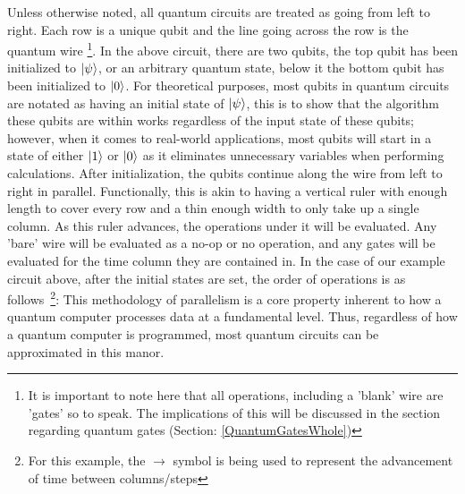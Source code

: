 \documentclass[a4paper]{article}
\begin{document}
	Unless otherwise noted, all quantum circuits are treated as going from left to right. Each row is a unique qubit and the line going across the row is the quantum wire \footnote{It is important to note here that all operations, including a 'blank' wire are 'gates' so to speak.  The implications of this will be discussed in the section regarding quantum gates (Section: \ref{QuantumGatesWhole})}.  In the above circuit, there are two qubits, the top qubit has been initialized to $\left\vert{\psi}\right\rangle$, or an arbitrary quantum state, below it the bottom qubit has been initialized to $\left\vert{0}\right\rangle$.  \newline
	\newline For theoretical purposes, most qubits in quantum circuits are notated as having an initial state of $\left\vert{\psi}\right\rangle$, this is to show that the algorithm these qubits are within works regardless of the input state of these qubits; however, when it comes to real-world applications, most qubits will start in a state of either $\left\vert{1}\right\rangle$ or $\left\vert{0}\right\rangle$ as it eliminates unnecessary variables when performing calculations. \newline
	\newline After initialization, the qubits continue along the wire from left to right in parallel.  Functionally, this is akin to having a vertical ruler with enough length to cover every row and a thin enough width to only take up a single column.  As this ruler advances, the operations under it will be evaluated. Any 'bare' wire will be evaluated as a no-op or no operation, and any gates will be evaluated for the time column they are contained in. \newline
	\newline In the case of our example circuit above, after the initial states are set, the order of operations is as follows~\footnote{For this example, the $\rightarrow$ symbol is being used to represent the advancement of time between columns/steps}:\newline \newline
	\fbox{$\rightarrow $}
	\fbox{$\rightarrow $}
	\fbox{$\rightarrow $}
	\fbox{$\rightarrow $}
	\fbox{$\rightarrow $}\newline %
	\newline \newline
	\label{CITENEEDEDHERE} %
	This methodology of parallelism is a core property inherent to how a quantum computer processes data at a fundamental level. Thus, regardless of how a quantum computer is programmed, most quantum circuits can be approximated in this manor.
	
\end{document}
